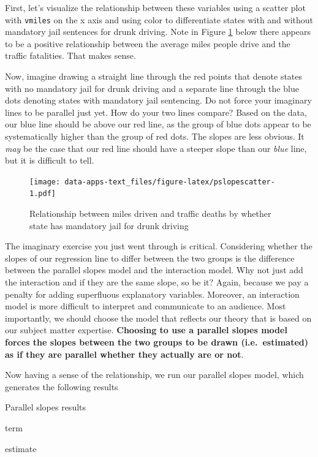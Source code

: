 \documentclass[
]{book}
\begin{document}
First, let's visualize the relationship between these variables using a scatter plot with \texttt{vmiles} on the x axis and using color to differentiate states with and without mandatory jail sentences for drunk driving. Note in Figure \ref{fig:pslopescatter} below there appears to be a positive relationship between the average miles people drive and the traffic fatalities. That makes sense.

Now, imagine drawing a straight line through the red points that denote states with no mandatory jail for drunk driving and a separate line through the blue dots denoting states with mandatory jail sentencing. Do not force your imaginary lines to be parallel just yet. How do your two lines compare? Based on the data, our blue line should be above our red line, as the group of blue dots appear to be systematically higher than the group of red dots. The slopes are less obvious. It \emph{may} be the case that our red line should have a steeper slope than our \emph{blue} line, but it is difficult to tell.

\begin{figure}
\centering
\texttt{[image: data-apps-text\_files/figure-latex/pslopescatter-1.pdf]}
\caption{\label{fig:pslopescatter}Relationship between miles driven and traffic deaths by whether state has mandatory jail for drunk driving}
\end{figure}

The imaginary exercise you just went through is critical. Considering whether the slopes of our regression line to differ between the two groups is the difference between the parallel slopes model and the interaction model. Why not just add the interaction and if they are the same slope, so be it? Again, because we pay a penalty for adding superfluous explanatory variables. Moreover, an interaction model is more difficult to interpret and communicate to an audience. Most importantly, we should choose the model that reflects our theory that is based on our subject matter expertise. \textbf{Choosing to use a parallel slopes model forces the slopes between the two groups to be drawn (i.e.~estimated) as if they are parallel whether they actually are or not}.

Now having a sense of the relationship, we run our parallel slopes model, which generates the following results

\label{tab:psloperesults}Parallel slopes results

term

estimate
\end{document}
